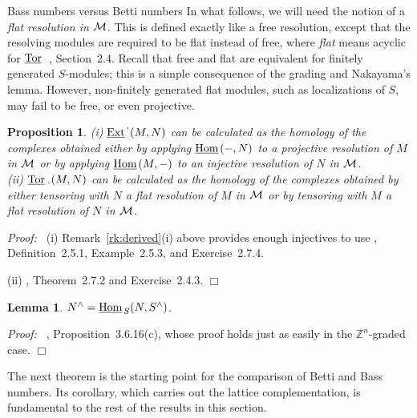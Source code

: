 \documentclass[12pt,leqno]{article}
\newtheorem{lemma}[thm]{Lemma}
\newtheorem{prop}[thm]{Proposition}
\def\hhom{{{\underline{\rm Hom}}{\scriptscriptstyle \,}}}
\def\eext{{{\underline{\rm Ext}}{\scriptscriptstyle \,}}}
\def\ttor{{{\underline{\rm Tor}}{\scriptstyle \;}}}
\def\ZZ{{\mathbb Z}}
\begin{document}
\begin{section}{Bass numbers versus Betti numbers}
In what follows, we will need the notion of a {\it flat resolution in
$\cal M$}.  This is defined exactly like a free resolution, except that
the resolving modules are required to be flat instead of free, where {\it
flat} means acyclic for $\ttor$ \cite{Wei}, Section~2.4.  Recall that
free and flat are equivalent for finitely generated $S$-modules; this is
a simple consequence of the grading and Nakayama's lemma.  However,
non-finitely generated flat modules, such as localizations of $S$, may
fail to be free, or even projective.
\begin{prop} \label{prop:calculate}
(i) $\eext^{\textstyle \cdot}(M,N)$ can be calculated as the homology of
the complexes obtained either by applying $\hhom(-,N)$ to a projective
resolution of $M$ in $\cal M$ or by applying $\hhom(M,-)$ to an injective
resolution of $N$ in $\cal M$. \\
(ii) $\ttor_{\textstyle \cdot}(M,N)$ can be calculated as the homology of
the complexes obtained by either tensoring with $N$ a flat resolution of
$M$ in $\cal M$ or by tensoring with $M$ a flat resolution of $N$ in
$\cal M$.
\end{prop}
{\it Proof:\ } (i) Remark~\ref{rk:derived}(i) above provides enough
injectives to use \cite{Wei}, Definition~2.5.1, Example~2.5.3, and
Exercise~2.7.4.

\vskip 1mm \noindent
(ii) \cite{Wei}, Theorem~2.7.2 and Exercise~2.4.3.  
%
\hfill
$\Box$

\begin{lemma}
$N^\wedge = \hhom_S(N,S^\wedge)$.
\end{lemma}
{\it Proof:\ } \cite{BH}, Proposition~3.6.16(c), whose proof holds just
as easily in the $\ZZ^n$-graded case.
%
\hfill 
$\Box$
\vskip 2mm

The next theorem is the starting point for the comparison of Betti and
Bass numbers.  Its corollary, which carries out the lattice
complementation, is fundamental to the rest of the results in this
section.


\end{section}
\end{document}

